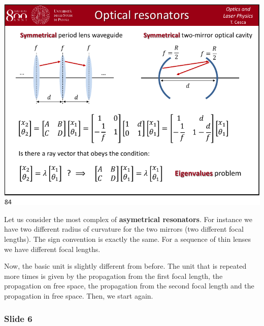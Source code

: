 \documentclass[../main/main.tex]{subfiles}
\begin{document}
\begin{minipage}[]{0.5\linewidth}
\centering
\includegraphics[page=5,width=1\textwidth]{../lessons/pdf_file/21_lecture.pdf}
\end{minipage}
\hspace{0.3cm}\vspace{0.3cm}
\begin{minipage}[c]{0.47\linewidth}

Let us consider the most complex of \textbf{asymetrical resonators}. For instance we have two different radius of curvature for the two mirrors (two different focal lengths). The sign convention is exactly the same.
For a sequence of thin lenses we have different focal lengths.

Now, the basic unit is slightly different from before. The unit that is repeated more times is given by the propagation from the first focal length, the propagation on free space, the propagation from the second focal length and the propagation in free space. Then, we start again.

\end{minipage}

\subsubsection*{Slide 6}
\end{document}
